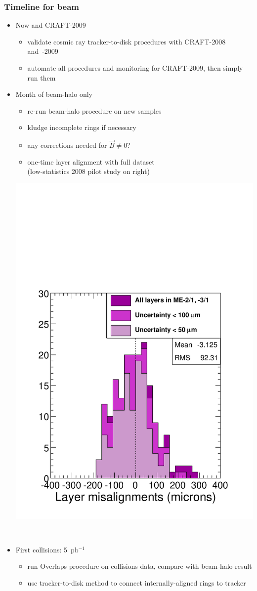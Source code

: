 \documentclass[compress]{beamer}
\begin{document}
\begin{frame}
\frametitle{Timeline for beam}
\scriptsize
\begin{itemize}
\item Now and CRAFT-2009
\begin{itemize}
\item \scriptsize validate cosmic ray tracker-to-disk procedures with CRAFT-2008 \mbox{and -2009\hspace{-1 cm}}
\item \scriptsize automate all procedures and monitoring for CRAFT-2009, then simply run them
\end{itemize}

\item Month of beam-halo only
\begin{itemize}
\item \scriptsize re-run beam-halo procedure on new samples
\item \scriptsize kludge incomplete rings if necessary
\item \scriptsize any corrections needed for $\vec{B} \ne 0$?
\item \scriptsize one-time layer alignment with full dataset \\ {\scriptsize (low-statistics 2008 pilot study on right)}
\end{itemize}

\vspace{-2.90 cm}
\hfill \includegraphics[width=0.3\linewidth]{layer_hist.pdf}

\vspace{-1.20 cm}
\mbox{ }

\item First collisions: 5~pb$^{-1}$
\begin{itemize}
\item \scriptsize run Overlaps procedure on collisions data, compare with beam-halo result
\item \scriptsize use tracker-to-disk method to connect internally-aligned rings to tracker
\end{itemize}


\end{itemize}
\end{frame}
\end{document}
